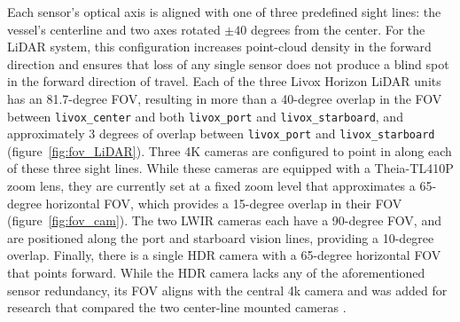 \documentclass{erauthesis}
\begin{document}
Each sensor’s optical axis is aligned with one of three predefined sight lines: the vessel's centerline and two axes rotated $\pm 40$ degrees from the center.
For the LiDAR system, this configuration increases point-cloud density in the forward direction and ensures that loss of any single sensor does not produce a blind spot in the forward direction of travel.
Each of the three Livox Horizon LiDAR units has an 81.7-degree \ac{FOV}, resulting in more than a 40-degree overlap in the \ac{FOV} between \texttt{livox\_center} and both \texttt{livox\_port} and \texttt{livox\_starboard}, and approximately 3 degrees of overlap between \texttt{livox\_port} and \texttt{livox\_starboard} (figure~\ref{fig:fov_LiDAR}).
Three 4K cameras are configured to point in along each of these three sight lines. 
While these cameras are equipped with a Theia-TL410P zoom lens, they are currently set at a fixed zoom level that approximates a 65-degree horizontal \ac{FOV}, which provides a 15-degree overlap in their \ac{FOV} (figure~\ref{fig:fov_cam}).
The two \ac{LWIR} cameras each have a 90-degree \acs{FOV}, and are positioned along the port and starboard vision lines, providing a 10-degree overlap.
Finally, there is a single HDR camera with a 65-degree horizontal \ac{FOV} that points forward.
While the \ac{HDR} camera lacks any of the aforementioned sensor redundancy, its \ac{FOV} aligns with the central 4k camera and was added for research that compared the two center-line mounted cameras \cite{liebergall}.

\end{document}
